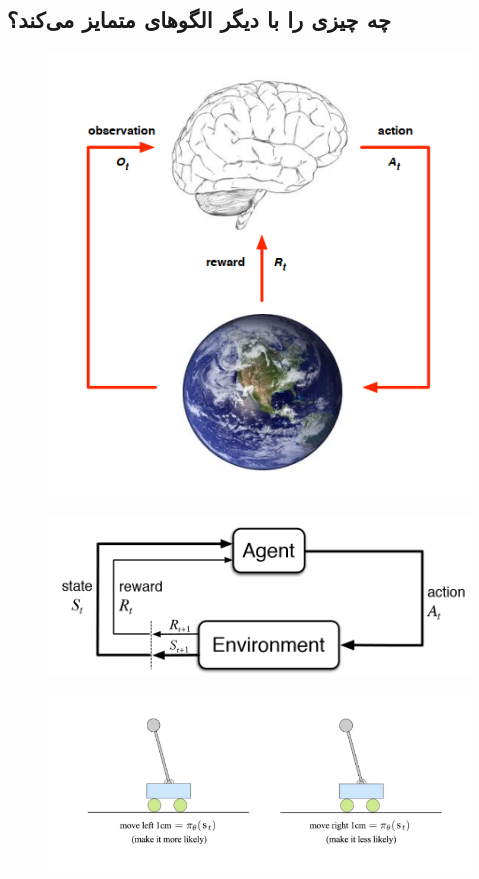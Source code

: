 \subsection[وجه تمایز 
\ws{rl}
از دیگر الگو‌های 
\ws{ml}
]{چه چیزی 
را با دیگر الگوهای 
متمایز می‌کند؟
}

\begin{figure}
	\centering
	\includegraphics[width=0.7\linewidth]{Figures/RL/Enviroment-brain-as-agent}
	\caption{}
	\label{fig:enviroment-brain-as-agent}
\end{figure}
\begin{figure}
	\centering
	\includegraphics[width=0.7\linewidth]{Figures/RL/Markov-vhain-SARSA}
	\caption{}
	\label{fig:markov-vhain-sarsa}
\end{figure}
\begin{figure}
	\centering
	\includegraphics[width=0.7\linewidth]{Figures/RL/RL-cartpole}
	\caption{}
	\label{fig:rl-cartpole}
\end{figure}